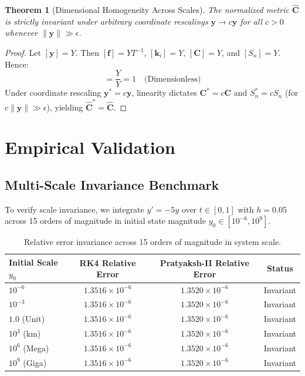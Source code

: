 \documentclass[11pt,a4paper]{article}
\theoremstyle{plain}
\newtheorem{theorem}{Theorem}
\theoremstyle{definition}
\begin{document}
\begin{theorem}[Dimensional Homogeneity Across Scales]
The normalized metric $\hat{\mathbf{C}}$ is strictly invariant under arbitrary coordinate rescalings $\mathbf{y} \to c \mathbf{y}$ for all $c > 0$ whenever $\|\mathbf{y}\| \gg \epsilon$.
\end{theorem}
\begin{proof}
Let $[\mathbf{y}] = Y$. Then $[\mathbf{f}] = Y T^{-1}$, $[\mathbf{k}_i] = Y$, $[\mathbf{C}] = Y$, and $[S_n] = Y$. Hence:
\begin{equation}
[\hat{\mathbf{C}}] = \frac{Y}{Y} = 1 \quad \text{(Dimensionless)}
\end{equation}
Under coordinate rescaling $\mathbf{y}^* = c \mathbf{y}$, linearity dictates $\mathbf{C}^* = c \mathbf{C}$ and $S_n^* = c S_n$ (for $c\|\mathbf{y}\| \gg \epsilon$), yielding $\hat{\mathbf{C}}^* = \hat{\mathbf{C}}$.
\end{proof}

\section{Empirical Validation}

\subsection{Multi-Scale Invariance Benchmark}
To verify scale invariance, we integrate $y' = -5y$ over $t \in [0, 1]$ with $h = 0.05$ across 15 orders of magnitude in initial state magnitude $y_0 \in [10^{-6}, 10^9]$.

\begin{table}[htbp]
\centering
\small
\begin{tabular}{@{}lccc@{}}
\toprule
\textbf{Initial Scale $y_0$} & \textbf{RK4 Relative Error} & \textbf{Pratyaksh-II Relative Error} & \textbf{Status} \\ \midrule
$10^{-6}$ & $1.3516 \times 10^{-6}$ & $1.3520 \times 10^{-6}$ & Invariant \\
$10^{-3}$ & $1.3516 \times 10^{-6}$ & $1.3520 \times 10^{-6}$ & Invariant \\
$1.0$ (Unit) & $1.3516 \times 10^{-6}$ & $1.3520 \times 10^{-6}$ & Invariant \\
$10^{3}$ (km) & $1.3516 \times 10^{-6}$ & $1.3520 \times 10^{-6}$ & Invariant \\
$10^{6}$ (Mega) & $1.3516 \times 10^{-6}$ & $1.3520 \times 10^{-6}$ & Invariant \\
$10^{9}$ (Giga) & $1.3516 \times 10^{-6}$ & $1.3520 \times 10^{-6}$ & Invariant \\ \bottomrule
\end{tabular}
\caption{Relative error invariance across 15 orders of magnitude in system scale.}
\label{tab:scale_invariance}
\end{table}
\end{document}
